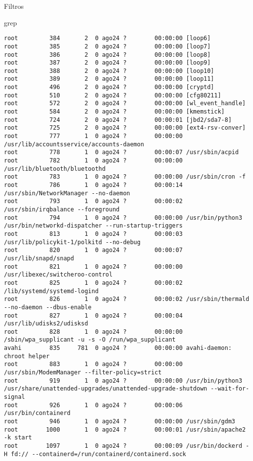 \begin{section}{Filtros}
\begin{subsection}{grep}
\begin{lstlisting}[style=Ubuntu]
root         384       2  0 ago24 ?        00:00:00 [loop6]
root         385       2  0 ago24 ?        00:00:00 [loop7]
root         386       2  0 ago24 ?        00:00:00 [loop8]
root         387       2  0 ago24 ?        00:00:00 [loop9]
root         388       2  0 ago24 ?        00:00:00 [loop10]
root         389       2  0 ago24 ?        00:00:00 [loop11]
root         496       2  0 ago24 ?        00:00:00 [cryptd]
root         510       2  0 ago24 ?        00:00:00 [cfg80211]
root         572       2  0 ago24 ?        00:00:00 [wl_event_handle]
root         584       2  0 ago24 ?        00:00:00 [kmemstick]
root         724       2  0 ago24 ?        00:00:01 [jbd2/sda7-8]
root         725       2  0 ago24 ?        00:00:00 [ext4-rsv-conver]
root         777       1  0 ago24 ?        00:00:00 /usr/lib/accountsservice/accounts-daemon
root         778       1  0 ago24 ?        00:00:07 /usr/sbin/acpid
root         782       1  0 ago24 ?        00:00:00 /usr/lib/bluetooth/bluetoothd
root         783       1  0 ago24 ?        00:00:00 /usr/sbin/cron -f
root         786       1  0 ago24 ?        00:00:14 /usr/sbin/NetworkManager --no-daemon
root         793       1  0 ago24 ?        00:00:02 /usr/sbin/irqbalance --foreground
root         794       1  0 ago24 ?        00:00:00 /usr/bin/python3 /usr/bin/networkd-dispatcher --run-startup-triggers
root         813       1  0 ago24 ?        00:00:03 /usr/lib/policykit-1/polkitd --no-debug
root         820       1  0 ago24 ?        00:00:07 /usr/lib/snapd/snapd
root         821       1  0 ago24 ?        00:00:00 /usr/libexec/switcheroo-control
root         825       1  0 ago24 ?        00:00:02 /lib/systemd/systemd-logind
root         826       1  0 ago24 ?        00:00:02 /usr/sbin/thermald --no-daemon --dbus-enable
root         827       1  0 ago24 ?        00:00:04 /usr/lib/udisks2/udisksd
root         828       1  0 ago24 ?        00:00:00 /sbin/wpa_supplicant -u -s -O /run/wpa_supplicant
avahi        835     781  0 ago24 ?        00:00:00 avahi-daemon: chroot helper
root         883       1  0 ago24 ?        00:00:00 /usr/sbin/ModemManager --filter-policy=strict
root         919       1  0 ago24 ?        00:00:00 /usr/bin/python3 /usr/share/unattended-upgrades/unattended-upgrade-shutdown --wait-for-signal
root         926       1  0 ago24 ?        00:00:06 /usr/bin/containerd
root         946       1  0 ago24 ?        00:00:00 /usr/sbin/gdm3
root        1000       1  0 ago24 ?        00:00:01 /usr/sbin/apache2 -k start
root        1097       1  0 ago24 ?        00:00:09 /usr/bin/dockerd -H fd:// --containerd=/run/containerd/containerd.sock

\end{lstlisting}
\end{subsection}
\end{section}
